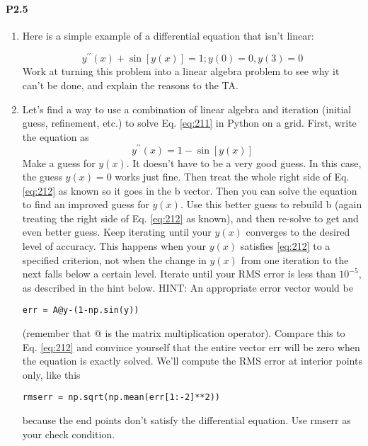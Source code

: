 \paragraph*{P2.5}
\begin{enumerate}[label=(\alph*)]
\item Here is a simple example of a differential equation that isn\rq t linear:

	\begin{equation}\label{eq:211}
		y^{\prime\prime}(x) + \sin[y(x)] = 1 ; y(0) = 0, y(3) = 0
	\end{equation}
		Work at turning this problem into a linear algebra problem to see why
it can\rq t be done, and explain the reasons to the TA.
\item Let\rq s find a way to use a combination of linear algebra and iteration
(initial guess, refinement, etc.) to solve Eq. \eqref{eq:211} in Python on a grid.
First, write the equation as
\begin{equation}\label{eq:212}
		y^{\prime\prime}(x)= 1 - \sin[y(x)]
	\end{equation}
	Make a guess for $y(x)$. It doesn\rq t have to be a very good guess. In this
case, the guess $y(x) = 0$ works just fine. Then treat the whole right side
of Eq.\eqref{eq:212} as known so it goes in the b vector. Then you can solve the equation to find an improved guess for
$y(x)$. Use this better guess to rebuild b (again treating the right side of Eq. \eqref{eq:212} as known), and
then re-solve to get and even better guess. Keep iterating until your $y(x)$ converges to the desired level of accuracy. This happens when your $y(x)$  satisfies \eqref{eq:212}  to a specified criterion, not when the change
in $y(x)$ from one iteration to the next falls below a certain level. Iterate until your RMS error is less than $10^{-5}$, as described in the hint below.
HINT: An appropriate error vector would be
\begin{lstlisting}
err = A@y-(1-np.sin(y))
\end{lstlisting}
(remember that @ is the matrix multiplication operator). Compare
this to Eq. \eqref{eq:212}
 and convince yourself that the entire vector err will
be zero when the equation is exactly solved. We\rq ll compute the RMS
error at interior points only, like this
\begin{lstlisting}
rmserr = np.sqrt(np.mean(err[1:-2]**2))
\end{lstlisting}
because the end points don\rq t satisfy the differential equation. Use rmserr as your check condition.
\end{enumerate}

